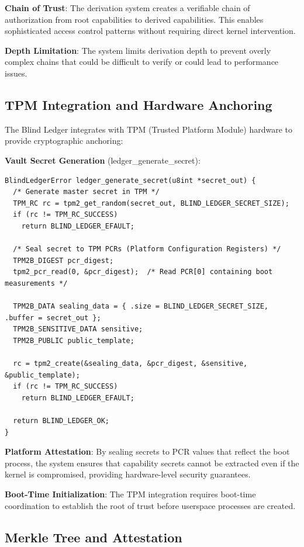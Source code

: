 \documentclass[11pt,letterpaper]{article}
\begin{document}
\textbf{Chain of Trust}: The derivation system creates a verifiable chain of authorization from root capabilities to derived capabilities. This enables sophisticated access control patterns without requiring direct kernel intervention.

\textbf{Depth Limitation}: The system limits derivation depth to prevent overly complex chains that could be difficult to verify or could lead to performance issues.

\subsection{TPM Integration and Hardware Anchoring}

The Blind Ledger integrates with TPM (Trusted Platform Module) hardware to provide cryptographic anchoring:

\textbf{Vault Secret Generation} (ledger\_generate\_secret):

\begin{lstlisting}
BlindLedgerError ledger_generate_secret(u8int *secret_out) {
  /* Generate master secret in TPM */
  TPM_RC rc = tpm2_get_random(secret_out, BLIND_LEDGER_SECRET_SIZE);
  if (rc != TPM_RC_SUCCESS)
    return BLIND_LEDGER_EFAULT;
    
  /* Seal secret to TPM PCRs (Platform Configuration Registers) */
  TPM2B_DIGEST pcr_digest;
  tpm2_pcr_read(0, &pcr_digest);  /* Read PCR[0] containing boot measurements */
  
  TPM2B_DATA sealing_data = { .size = BLIND_LEDGER_SECRET_SIZE, .buffer = secret_out };
  TPM2B_SENSITIVE_DATA sensitive;
  TPM2B_PUBLIC public_template;
  
  rc = tpm2_create(&sealing_data, &pcr_digest, &sensitive, &public_template);
  if (rc != TPM_RC_SUCCESS)
    return BLIND_LEDGER_EFAULT;
    
  return BLIND_LEDGER_OK;
}
\end{lstlisting}

\textbf{Platform Attestation}: By sealing secrets to PCR values that reflect the boot process, the system ensures that capability secrets cannot be extracted even if the kernel is compromised, providing hardware-level security guarantees.

\textbf{Boot-Time Initialization}: The TPM integration requires boot-time coordination to establish the root of trust before userspace processes are created.

\subsection{Merkle Tree and Attestation}
\end{document}
